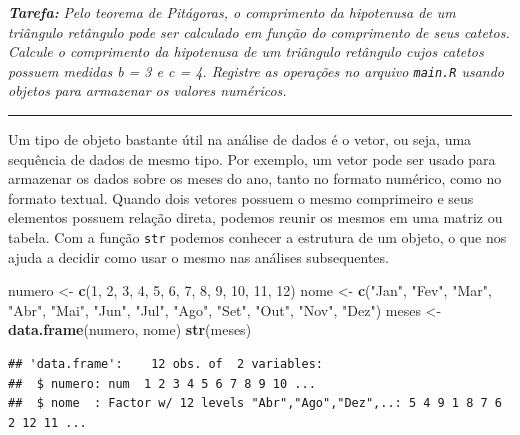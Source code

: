 \documentclass[
]{book}
\newenvironment{Shaded}{\begin{snugshade}}{\end{snugshade}}
\newcommand{\DecValTok}[1]{\textcolor[rgb]{0.00,0.00,0.81}{#1}}
\newcommand{\KeywordTok}[1]{\textcolor[rgb]{0.13,0.29,0.53}{\textbf{#1}}}
\newcommand{\NormalTok}[1]{#1}
\newcommand{\StringTok}[1]{\textcolor[rgb]{0.31,0.60,0.02}{#1}}
\begin{document}
\textbf{\emph{Tarefa:}} \emph{Pelo teorema de Pitágoras, o comprimento da hipotenusa de um triângulo retângulo pode ser calculado em função do comprimento de seus catetos. Calcule o comprimento da hipotenusa de um triângulo retângulo cujos catetos possuem medidas b = 3 e c = 4. Registre as operações no arquivo \texttt{main.R} usando objetos para armazenar os valores numéricos.}

\begin{center}\rule{0.5\linewidth}{0.5pt}\end{center}

Um tipo de objeto bastante útil na análise de dados é o vetor, ou seja, uma sequência de dados de mesmo tipo. Por exemplo, um vetor pode ser usado para armazenar os dados sobre os meses do ano, tanto no formato numérico, como no formato textual. Quando dois vetores possuem o mesmo comprimeiro e seus elementos possuem relação direta, podemos reunir os mesmos em uma matriz ou tabela. Com a função \texttt{str} podemos conhecer a estrutura de um objeto, o que nos ajuda a decidir como usar o mesmo nas análises subsequentes.

\begin{Shaded}
\begin{Highlighting}[]
\NormalTok{numero <-}\StringTok{ }\KeywordTok{c}\NormalTok{(}\DecValTok{1}\NormalTok{, }\DecValTok{2}\NormalTok{, }\DecValTok{3}\NormalTok{, }\DecValTok{4}\NormalTok{, }\DecValTok{5}\NormalTok{, }\DecValTok{6}\NormalTok{, }\DecValTok{7}\NormalTok{, }\DecValTok{8}\NormalTok{, }\DecValTok{9}\NormalTok{, }\DecValTok{10}\NormalTok{, }\DecValTok{11}\NormalTok{, }\DecValTok{12}\NormalTok{)}
\NormalTok{nome <-}\StringTok{ }\KeywordTok{c}\NormalTok{(}\StringTok{"Jan"}\NormalTok{, }\StringTok{"Fev"}\NormalTok{, }\StringTok{"Mar"}\NormalTok{, }\StringTok{"Abr"}\NormalTok{, }\StringTok{"Mai"}\NormalTok{, }\StringTok{"Jun"}\NormalTok{,}
          \StringTok{"Jul"}\NormalTok{, }\StringTok{"Ago"}\NormalTok{, }\StringTok{"Set"}\NormalTok{, }\StringTok{"Out"}\NormalTok{, }\StringTok{"Nov"}\NormalTok{, }\StringTok{"Dez"}\NormalTok{)}
\NormalTok{meses <-}\StringTok{ }\KeywordTok{data.frame}\NormalTok{(numero, nome)}
\KeywordTok{str}\NormalTok{(meses)}
\end{Highlighting}
\end{Shaded}

\begin{verbatim}
## 'data.frame':    12 obs. of  2 variables:
##  $ numero: num  1 2 3 4 5 6 7 8 9 10 ...
##  $ nome  : Factor w/ 12 levels "Abr","Ago","Dez",..: 5 4 9 1 8 7 6 2 12 11 ...
\end{verbatim}
\end{document}
